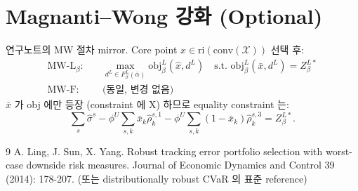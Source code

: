 \documentclass[11pt]{article}
\newcommand{\cX}{\mathcal{X}}
\theoremstyle{plain}
\theoremstyle{remark}
\begin{document}
\section{Magnanti--Wong 강화 (Optional)}
\label{sec:mw}

연구노트의 MW 절차 mirror. Core point $\hat x \in \mathrm{ri}(\mathrm{conv}(\cX))$ 선택 후:
\begin{align*}
\text{MW-L}_\beta:&\quad \max_{d^L \in F^L_\beta(\bar\alpha)} \mathrm{obj}^L_\beta(\hat x, d^L) \quad\text{s.t.\ } \mathrm{obj}^L_\beta(\bar x, d^L) = Z^{L*}_\beta\\
\text{MW-F}:&\quad \text{(동일, 변경 없음)}
\end{align*}
$\bar x$ 가 obj 에만 등장 (constraint 에 X) 하므로 equality constraint 는:
\[
\textstyle\sum_s \hat\sigma^s - \phi^U \sum_{s,k} \bar x_k \hat\rho_k^{s,1} - \phi^U \sum_{s,k}(1-\bar x_k)\hat\rho_k^{s,3} = Z^{L*}_\beta.
\]


\begin{thebibliography}{9}
A. Ling, J. Sun, X. Yang. Robust tracking error portfolio selection with worst-case downside risk measures. Journal of Economic Dynamics and Control 39 (2014): 178-207. (또는 distributionally robust CVaR 의 표준 reference)
\end{thebibliography}
\end{document}
